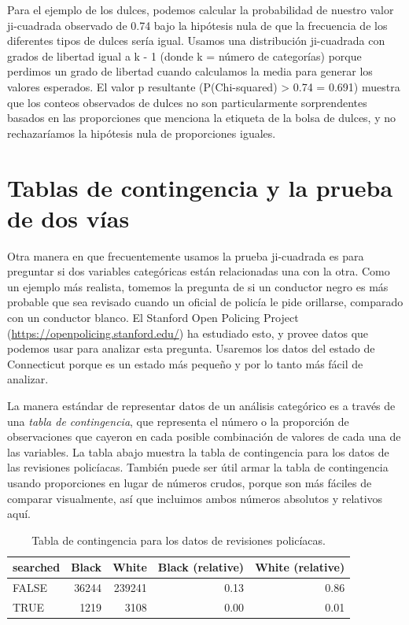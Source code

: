 \documentclass[
  12pt,
]{book}
\theoremstyle{definition}
\theoremstyle{definition}
\theoremstyle{definition}
\theoremstyle{remark}
\begin{document}
Para el ejemplo de los dulces, podemos calcular la probabilidad de nuestro valor ji-cuadrada observado de 0.74 bajo la hipótesis nula de que la frecuencia de los diferentes tipos de dulces sería igual. Usamos una distribución ji-cuadrada con grados de libertad igual a k - 1 (donde k = número de categorías) porque perdimos un grado de libertad cuando calculamos la media para generar los valores esperados. El valor p resultante (P(Chi-squared) \textgreater{} 0.74 = 0.691) muestra que los conteos observados de dulces no son particularmente sorprendentes basados en las proporciones que menciona la etiqueta de la bolsa de dulces, y no rechazaríamos la hipótesis nula de proporciones iguales.

\hypertarget{two-way-test}{%
\section{Tablas de contingencia y la prueba de dos vías}\label{two-way-test}}

Otra manera en que frecuentemente usamos la prueba ji-cuadrada es para preguntar si dos variables categóricas están relacionadas una con la otra. Como un ejemplo más realista, tomemos la pregunta de si un conductor negro es más probable que sea revisado cuando un oficial de policía le pide orillarse, comparado con un conductor blanco. El Stanford Open Policing Project (\url{https://openpolicing.stanford.edu/}) ha estudiado esto, y provee datos que podemos usar para analizar esta pregunta. Usaremos los datos del estado de Connecticut porque es un estado más pequeño y por lo tanto más fácil de analizar.

La manera estándar de representar datos de un análisis categórico es a través de una \emph{tabla de contingencia}, que representa el número o la proporción de observaciones que cayeron en cada posible combinación de valores de cada una de las variables. La tabla abajo muestra la tabla de contingencia para los datos de las revisiones policíacas. También puede ser útil armar la tabla de contingencia usando proporciones en lugar de números crudos, porque son más fáciles de comparar visualmente, así que incluimos ambos números absolutos y relativos aquí.

\begin{table}

\caption{\label{tab:unnamed-chunk-79}Tabla de contingencia para los datos de revisiones policíacas.}
\centering
\begin{tabular}[t]{l|r|r|r|r}
\hline
searched & Black & White & Black (relative) & White (relative)\\
\hline
FALSE & 36244 & 239241 & 0.13 & 0.86\\
\hline
TRUE & 1219 & 3108 & 0.00 & 0.01\\
\hline
\end{tabular}
\end{table}
\end{document}
